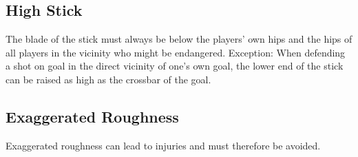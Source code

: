 \subsection{High Stick \label{subsec:hockey_safety_stick}}
The blade of the stick must always be below the players' own hips and the hips of all players in the vicinity who might be endangered.
Exception: When defending a shot on goal in the direct vicinity of one's own goal, the lower end of the stick can be raised as high as the crossbar of the goal.

\subsection{Exaggerated Roughness}
Exaggerated roughness can lead to injuries and must therefore be avoided.
